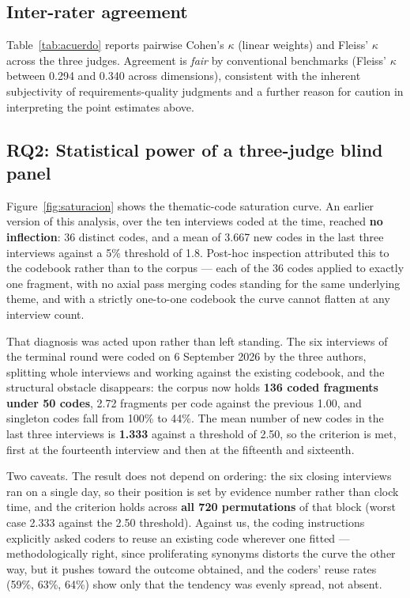 \documentclass{llncs}
\begin{document}
\subsection{Inter-rater agreement}

Table~\ref{tab:acuerdo} reports pairwise Cohen's $\kappa$ (linear weights) and Fleiss'
$\kappa$ across the three judges. Agreement is \emph{fair} by conventional benchmarks
(Fleiss' $\kappa$ between 0.294 and 0.340 across dimensions), consistent with the
inherent subjectivity of requirements-quality judgments and a further reason for
caution in interpreting the point estimates above.



\subsection{RQ2: Statistical power of a three-judge blind panel}

Figure~\ref{fig:saturacion} shows the thematic-code saturation curve. An earlier version
of this analysis, over the ten interviews coded at the time, reached \textbf{no
inflection}: 36 distinct codes, and a mean of 3.667 new codes in the last three
interviews against a 5\% threshold of 1.8. Post-hoc inspection attributed this to the
codebook rather than to the corpus --- each of the 36 codes applied to exactly one
fragment, with no axial pass merging codes standing for the same underlying theme, and
with a strictly one-to-one codebook the curve cannot flatten at any interview count.

That diagnosis was acted upon rather than left standing. The six interviews of the
terminal round were coded on 6 September 2026 by the three authors, splitting whole
interviews and working against the existing codebook, and the structural obstacle
disappears: the corpus now holds \textbf{136 coded fragments under 50 codes}, 2.72
fragments per code against the previous 1.00, and singleton codes fall from 100\% to
44\%. The mean number of new codes in the last three interviews is \textbf{1.333}
against a threshold of 2.50, so the criterion is met, first at the fourteenth interview
and then at the fifteenth and sixteenth.

Two caveats. The result does not depend on ordering: the six closing interviews ran on a
single day, so their position is set by evidence number rather than clock time, and the
criterion holds across \textbf{all 720 permutations} of that block (worst case 2.333
against the 2.50 threshold). Against us, the coding instructions explicitly asked coders
to reuse an existing code wherever one fitted --- methodologically right, since
proliferating synonyms distorts the curve the other way, but it pushes toward the outcome
obtained, and the coders' reuse rates (59\%, 63\%, 64\%) show only that the tendency was
evenly spread, not absent.
\end{document}
